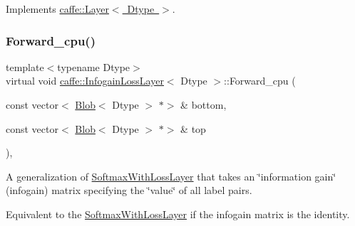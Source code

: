 Implements \mbox{\hyperlink{classcaffe_1_1_layer_a576ac6a60b1e99fe383831f52a6cea77}{caffe\+::\+Layer$<$ Dtype $>$}}.

\mbox{\label{classcaffe_1_1_infogain_loss_layer_a12c67529a9dbc6732db60708a4d9a9f6}} 
\subsubsection{\texorpdfstring{Forward\+\_\+cpu()}{Forward\_cpu()}\hspace{0.1cm}{\footnotesize\ttfamily [2/2]}}
{\footnotesize\ttfamily template$<$typename Dtype$>$ \\
virtual void \mbox{\hyperlink{classcaffe_1_1_infogain_loss_layer}{caffe\+::\+Infogain\+Loss\+Layer}}$<$ Dtype $>$\+::Forward\+\_\+cpu (\begin{DoxyParamCaption}\item[{const vector$<$ \mbox{\hyperlink{classcaffe_1_1_blob}{Blob}}$<$ Dtype $>$ $\ast$$>$ \&}]{bottom,  }\item[{const vector$<$ \mbox{\hyperlink{classcaffe_1_1_blob}{Blob}}$<$ Dtype $>$ $\ast$$>$ \&}]{top }\end{DoxyParamCaption})\hspace{0.3cm}{\ttfamily [protected]}, {\ttfamily [virtual]}}



A generalization of \mbox{\hyperlink{classcaffe_1_1_softmax_with_loss_layer}{Softmax\+With\+Loss\+Layer}} that takes an \char`\"{}information gain\char`\"{} (infogain) matrix specifying the \char`\"{}value\char`\"{} of all label pairs. 

Equivalent to the \mbox{\hyperlink{classcaffe_1_1_softmax_with_loss_layer}{Softmax\+With\+Loss\+Layer}} if the infogain matrix is the identity.


